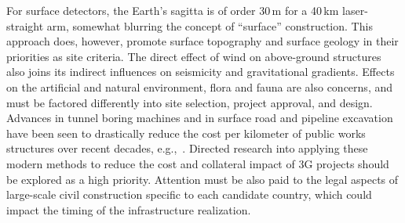 For surface detectors, 
the Earth’s sagitta is of order 30\,m for a 40\,km laser-straight arm, somewhat blurring the concept of “surface” construction. This approach does, however, promote surface topography and surface geology in their priorities as site criteria. The direct effect of wind on above-ground structures also joins its indirect influences on seismicity and gravitational gradients. Effects on the artificial and natural environment, flora and fauna are also concerns, and must be factored differently into site selection, project approval, and design.
Advances in tunnel boring machines and in surface road and pipeline excavation have been seen to drastically reduce the cost per kilometer of public works structures over recent decades, e.g.,~\cite{BoringCompany}. Directed research into applying these modern methods to reduce the cost and collateral impact of \ac{3G} projects should be explored as a high priority. Attention must be also paid to the legal aspects of large-scale civil construction specific to each candidate country, which could impact the timing of the infrastructure realization. 




